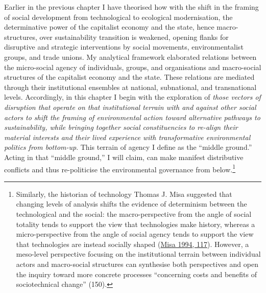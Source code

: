 \documentclass[a4paper, nobind]{templates/ociamthesis}
\begin{document}
Earlier in the previous chapter I have theorised how with the shift in the framing of social development from technological to ecological modernisation, the determinative power of the capitalist economy and the state, hence macro-structures, over sustainability transition is weakened, opening flanks for disruptive and strategic interventions by social movements, environmentalist groups, and trade unions. My analytical framework elaborated relations between the micro-social agency of individuals, groups, and organisations and macro-social structures of the capitalist economy and the state. These relations are mediated through their institutional ensembles at national, subnational, and transnational levels. Accordingly, in this chapter I begin with the exploration of \emph{those vectors of disruption that operate on that institutional terrain with and against other social actors to shift the framing of environmental action toward alternative pathways to sustainability, while bringing together social constituencies to re-align their material interests and their lived experience with transformative environmental politics from bottom-up}. This terrain of agency I define as the ``middle ground.'' Acting in that ``middle ground,'' I will claim, can make manifest distributive conflicts and thus re-politicise the environmental governance from below.\footnote{Similarly, the historian of technology Thomas J. Misa suggested that changing levels of analysis shifts the evidence of determinism between the technological and the social: the macro-perspective from the angle of social totality tends to support the view that technologies make history, whereas a micro-perspective from the angle of social agency tends to support the view that technologies are instead socially shaped (\protect\hyperlink{ref-misa_retrieving_1994}{Misa 1994, 117}). However, a meso-level perspective focusing on the institutional terrain between individual actors and macro-social structures can synthesise both perspectives and open the inquiry toward more concrete processes ``concerning costs and benefits of sociotechnical change'' (150).}
\end{document}
